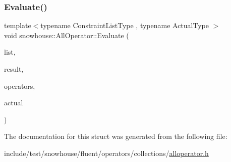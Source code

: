 \subsubsection{\texorpdfstring{Evaluate()}{Evaluate()}}
{\footnotesize\ttfamily template$<$typename Constraint\+List\+Type , typename Actual\+Type $>$ \\
void snowhouse\+::\+All\+Operator\+::\+Evaluate (\begin{DoxyParamCaption}\item[{Constraint\+List\+Type \&}]{list,  }\item[{\mbox{\hyperlink{namespacesnowhouse_a719169b1315a13161c15f25e600a8f51}{Result\+Stack}} \&}]{result,  }\item[{\mbox{\hyperlink{namespacesnowhouse_adcb10e215e6a4bbcb35722a9c7270fc6}{Operator\+Stack}} \&}]{operators,  }\item[{const Actual\+Type \&}]{actual }\end{DoxyParamCaption})\hspace{0.3cm}{\ttfamily [inline]}}



The documentation for this struct was generated from the following file\+:\begin{DoxyCompactItemize}
\item 
include/test/snowhouse/fluent/operators/collections/\mbox{\hyperlink{alloperator_8h}{alloperator.\+h}}\end{DoxyCompactItemize}
